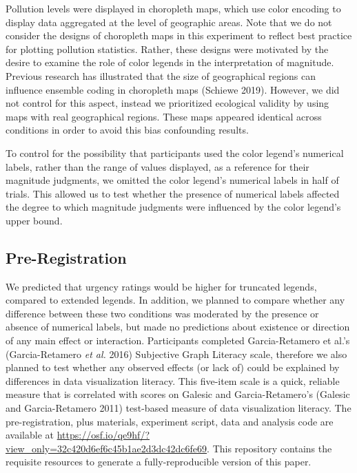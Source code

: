 \documentclass[
]{interact}
\begin{document}
Pollution levels were displayed in choropleth maps, which use color
encoding to display data aggregated at the level of geographic areas.
Note that we do not consider the designs of choropleth maps in this
experiment to reflect best practice for plotting pollution statistics.
Rather, these designs were motivated by the desire to examine the role
of color legends in the interpretation of magnitude. Previous research
has illustrated that the size of geographical regions can influence
ensemble coding in choropleth maps (Schiewe 2019). However, we did not
control for this aspect, instead we prioritized ecological validity by
using maps with real geographical regions. These maps appeared identical
across conditions in order to avoid this bias confounding results.

To control for the possibility that participants used the color legend's
numerical labels, rather than the range of values displayed, as a
reference for their magnitude judgments, we omitted the color legend's
numerical labels in half of trials. This allowed us to test whether the
presence of numerical labels affected the degree to which magnitude
judgments were influenced by the color legend's upper bound.

\hypertarget{pre-registration}{%
\subsection{Pre-Registration}\label{pre-registration}}

We predicted that urgency ratings would be higher for truncated legends,
compared to extended legends. In addition, we planned to compare whether
any difference between these two conditions was moderated by the
presence or absence of numerical labels, but made no predictions about
existence or direction of any main effect or interaction. Participants
completed Garcia-Retamero et al.'s (Garcia-Retamero \emph{et al.} 2016)
Subjective Graph Literacy scale, therefore we also planned to test
whether any observed effects (or lack of) could be explained by
differences in data visualization literacy. This five-item scale is a
quick, reliable measure that is correlated with scores on Galesic and
Garcia-Retamero's (Galesic and Garcia-Retamero 2011) test-based measure
of data visualization literacy. The pre-registration, plus materials,
experiment script, data and analysis code are available at
\url{https://osf.io/qe9hf/?view_only=32c420d6ef6c45b1ae2d3dc42dc6fe69}.
This repository contains the requisite resources to generate a
fully-reproducible version of this paper.
\end{document}
